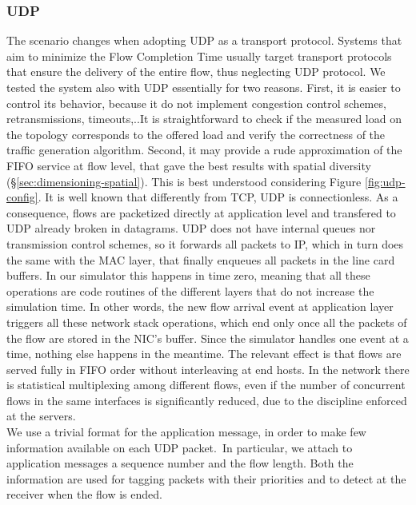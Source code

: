 \subsubsection{UDP}
The scenario changes when adopting UDP as a transport protocol. Systems that aim to minimize the Flow Completion Time usually target transport protocols that ensure the delivery of the entire flow, thus neglecting UDP protocol. We tested the system also with UDP essentially for two reasons. First, it is easier to control its behavior, because it do not implement congestion control schemes, retransmissions, timeouts,..It is straightforward to check if the measured load on the topology corresponds to the offered load and verify the correctness of the traffic generation algorithm. Second, it may provide a rude approximation of the FIFO service at flow level, that gave the best results with spatial diversity (\S \ref{sec:dimensioning-spatial}). This is best understood considering Figure \ref{fig:udp-config}. It is well known that differently from TCP, UDP is connectionless. As a consequence, flows are packetized directly at application level and transfered to UDP already broken in datagrams. UDP does not have internal queues nor transmission control schemes, so it forwards all packets to IP, which in turn does the same with the MAC layer, that finally enqueues all packets in the line card buffers. In our simulator this happens in time zero, meaning that all these operations are code routines of the different layers that do not increase the simulation time. In other words, the new flow arrival event at application layer triggers all these network stack operations, which end only once all the packets of the flow are stored in the NIC's buffer. Since the simulator handles one event at a time, nothing else happens in the meantime. The relevant effect is that flows are served fully in FIFO order without interleaving at end hosts. In the network there is statistical multiplexing among different flows, even if the number of concurrent flows in the same interfaces is significantly reduced, due to the discipline enforced at the servers.\\
We use a trivial format for the application message, in order to make few information available on each UDP packet. In particular, we attach to application messages a sequence number and the flow length. Both the information are used for tagging packets with their priorities and to detect at the receiver when the flow is ended.
